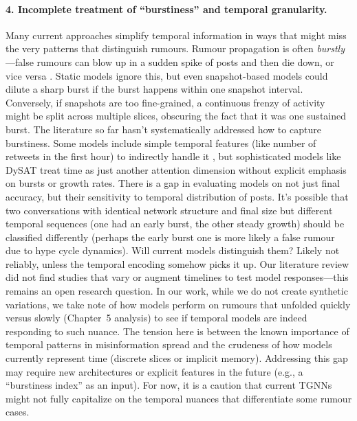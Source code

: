 \documentclass{cshonours}
\begin{document}
\paragraph{4. Incomplete treatment of “burstiness” and temporal granularity.} Many current approaches simplify temporal information in ways that might miss the very patterns that distinguish rumours. Rumour propagation is often \emph{burstly}—false rumours can blow up in a sudden spike of posts and then die down, or vice versa \cite{vosoughi2018spread}. Static models ignore this, but even snapshot-based models could dilute a sharp burst if the burst happens within one snapshot interval. Conversely, if snapshots are too fine-grained, a continuous frenzy of activity might be split across multiple slices, obscuring the fact that it was one sustained burst. The literature so far hasn’t systematically addressed how to capture burstiness. Some models include simple temporal features (like number of retweets in the first hour) to indirectly handle it \cite{yang2018tiinet}, but sophisticated models like DySAT treat time as just another attention dimension without explicit emphasis on bursts or growth rates. There is a gap in evaluating models on not just final accuracy, but their sensitivity to temporal distribution of posts. It’s possible that two conversations with identical network structure and final size but different temporal sequences (one had an early burst, the other steady growth) should be classified differently (perhaps the early burst one is more likely a false rumour due to hype cycle dynamics). Will current models distinguish them? Likely not reliably, unless the temporal encoding somehow picks it up. Our literature review did not find studies that vary or augment timelines to test model responses—this remains an open research question. In our work, while we do not create synthetic variations, we take note of how models perform on rumours that unfolded quickly versus slowly (Chapter~5 analysis) to see if temporal models are indeed responding to such nuance. The tension here is between the known importance of temporal patterns in misinformation spread and the crudeness of how models currently represent time (discrete slices or implicit memory). Addressing this gap may require new architectures or explicit features in the future (e.g., a “burstiness index” as an input). For now, it is a caution that current TGNNs might not fully capitalize on the temporal nuances that differentiate some rumour cases.
\end{document}
